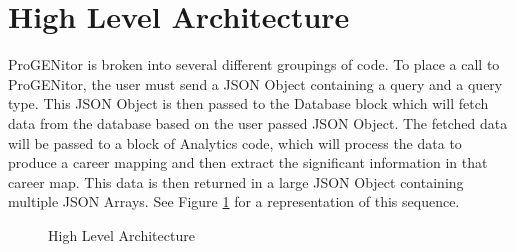 \section{High Level Architecture}
\label{sect:high-level-architecture}
ProGENitor is broken into several different groupings of code.  To place a call
to ProGENitor, the user must send a JSON Object containing a query and a query
type.  This JSON Object is then passed to the Database block which will fetch
data from the database based on the user passed JSON Object.  The fetched data
will be passed to a block of Analytics code, which will process the data to
produce a career mapping and then extract the significant information in that
career map.  This data is then returned in a large JSON Object containing multiple JSON
Arrays. See Figure
\ref{fig:HighLevelProjectArchitecture}
for a representation of this sequence.

\usetikzlibrary{shapes,arrows,chains}

\begin{figure}[H]
	\centering
  

	\caption{High Level Architecture}
	\label{fig:HighLevelProjectArchitecture}
\end{figure}

